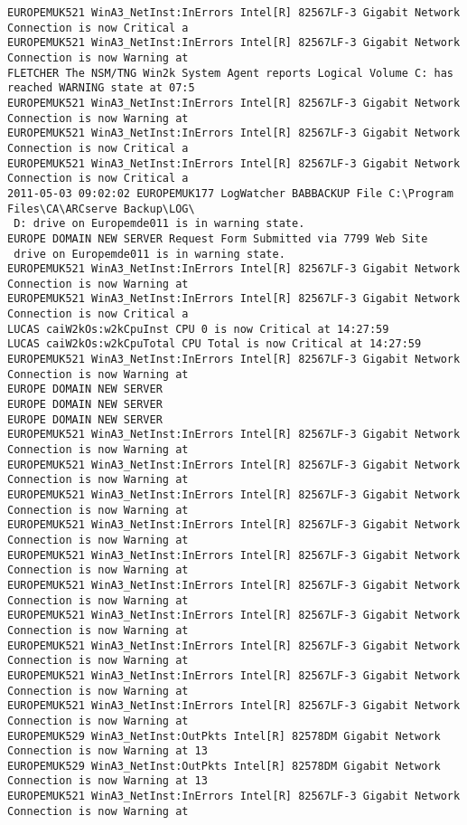 \begin{lstlisting}
EUROPEMUK521 WinA3_NetInst:InErrors Intel[R] 82567LF-3 Gigabit Network Connection is now Critical a
EUROPEMUK521 WinA3_NetInst:InErrors Intel[R] 82567LF-3 Gigabit Network Connection is now Warning at
FLETCHER The NSM/TNG Win2k System Agent reports Logical Volume C: has reached WARNING state at 07:5
EUROPEMUK521 WinA3_NetInst:InErrors Intel[R] 82567LF-3 Gigabit Network Connection is now Warning at
EUROPEMUK521 WinA3_NetInst:InErrors Intel[R] 82567LF-3 Gigabit Network Connection is now Critical a
EUROPEMUK521 WinA3_NetInst:InErrors Intel[R] 82567LF-3 Gigabit Network Connection is now Critical a
2011-05-03 09:02:02 EUROPEMUK177 LogWatcher BABBACKUP File C:\Program Files\CA\ARCserve Backup\LOG\
 D: drive on Europemde011 is in warning state.
EUROPE DOMAIN NEW SERVER Request Form Submitted via 7799 Web Site
 drive on Europemde011 is in warning state.
EUROPEMUK521 WinA3_NetInst:InErrors Intel[R] 82567LF-3 Gigabit Network Connection is now Warning at
EUROPEMUK521 WinA3_NetInst:InErrors Intel[R] 82567LF-3 Gigabit Network Connection is now Critical a
LUCAS caiW2kOs:w2kCpuInst CPU 0 is now Critical at 14:27:59
LUCAS caiW2kOs:w2kCpuTotal CPU Total is now Critical at 14:27:59
EUROPEMUK521 WinA3_NetInst:InErrors Intel[R] 82567LF-3 Gigabit Network Connection is now Warning at
EUROPE DOMAIN NEW SERVER
EUROPE DOMAIN NEW SERVER
EUROPE DOMAIN NEW SERVER
EUROPEMUK521 WinA3_NetInst:InErrors Intel[R] 82567LF-3 Gigabit Network Connection is now Warning at
EUROPEMUK521 WinA3_NetInst:InErrors Intel[R] 82567LF-3 Gigabit Network Connection is now Warning at
EUROPEMUK521 WinA3_NetInst:InErrors Intel[R] 82567LF-3 Gigabit Network Connection is now Warning at
EUROPEMUK521 WinA3_NetInst:InErrors Intel[R] 82567LF-3 Gigabit Network Connection is now Warning at
EUROPEMUK521 WinA3_NetInst:InErrors Intel[R] 82567LF-3 Gigabit Network Connection is now Warning at
EUROPEMUK521 WinA3_NetInst:InErrors Intel[R] 82567LF-3 Gigabit Network Connection is now Warning at
EUROPEMUK521 WinA3_NetInst:InErrors Intel[R] 82567LF-3 Gigabit Network Connection is now Warning at
EUROPEMUK521 WinA3_NetInst:InErrors Intel[R] 82567LF-3 Gigabit Network Connection is now Warning at
EUROPEMUK521 WinA3_NetInst:InErrors Intel[R] 82567LF-3 Gigabit Network Connection is now Warning at
EUROPEMUK521 WinA3_NetInst:InErrors Intel[R] 82567LF-3 Gigabit Network Connection is now Warning at
EUROPEMUK529 WinA3_NetInst:OutPkts Intel[R] 82578DM Gigabit Network Connection is now Warning at 13
EUROPEMUK529 WinA3_NetInst:OutPkts Intel[R] 82578DM Gigabit Network Connection is now Warning at 13
EUROPEMUK521 WinA3_NetInst:InErrors Intel[R] 82567LF-3 Gigabit Network Connection is now Warning at

\end{lstlisting}
